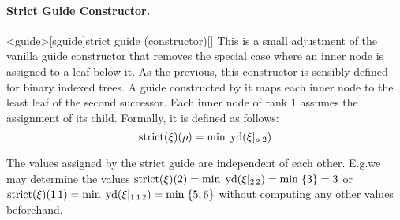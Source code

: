 \documentclass[../../document.tex]{subfiles}
\begin{document}
    \paragraph{Strict Guide Constructor.}<guide>[sguide]{strict guide (constructor)}[]
    This is a small adjustment of the vanilla guide constructor that removes the special case where an inner node is assigned to a leaf below it.
    As the previous, this constructor is sensibly defined for binary indexed trees.
    A guide constructed by it maps each inner node to the least leaf of the second successor.
    Each inner node of rank 1 assumes the assignment of its child.
    Formally, it is defined as follows:
    \[
        \mathrm{strict}(\xi)(\rho) = \min \; \operatorname{yd}(\xi|_{\rho\cdot 2})
    \]

    The values assigned by the strict guide are independent of each other.
    E.g.\@ we may determine the values \(\mathrm{strict}(\xi)(2) = \min\;\operatorname{yd}(\xi|_{2\,2}) = \min\;\{3\} = 3\) or \(\mathrm{strict}(\xi)(1\,1) = \min\;\operatorname{yd}(\xi|_{1\,1\,2}) = \min\;\{5,6\}\) without computing any other values beforehand.
\end{document}
